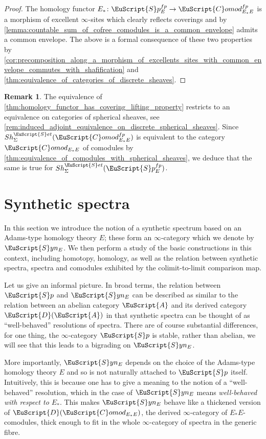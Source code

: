 \documentclass[oneside,a4paper]{amsart}
\newcommand{\euscr}[1]{\EuScript{#1}} %
\newcommand{\acat}{\euscr{A}} %
\newcommand{\dcat}{\euscr{D}} %
\newcommand{\spectra}{\euscr{S}p} %
\newcommand{\sets}{\euscr{S}et} %
\newcommand{\synspectra}{\euscr{S}yn} %
\newcommand{\spectrafp}{\spectra_{E}^{fp}} %
\newcommand{\Comod}{\euscr{C}omod} %
\newcommand{\ComodE}{\Comod_{E_{*}E}} %
\theoremstyle{plain}
\theoremstyle{definition}
\newtheorem{rem}[thm]{Remark}
\theoremstyle{remark}
\begin{document}
\begin{proof}
The homology functor $E_{*} \colon \spectrafp \rightarrow \ComodE^{fp}$ is a morphism of excellent $\infty$-sites which clearly reflects coverings and by \cref{lemma:countable_sum_of_cofree_comodules_is_a_common_envelope} admits a common envelope. The above is a formal consequence of these two properties by \cref{cor:precomposition_along_a_morphism_of_excellents_sites_with_common_envelope_commutes_with_shafification} and 
\cref{thm:equivalence_of_categories_of_discrete_sheaves}. 
\end{proof}

\begin{rem}
\label{rem:discrete_spherical_sheaves_on_fpspectra_are_comodules}
The equivalence of \cref{thm:homology_functor_has_covering_lifting_property} restricts to an equivalence on categories of spherical sheaves, see \cref{rem:induced_adjoint_equivalence_on_discrete_spherical_sheaves}. Since $Sh^{\sets}_{\Sigma}(\ComodE^{fp})$ is equivalent to the category $\ComodE$ of comodules by \cref{thm:equivalence_of_comodules_with_spherical_sheaves}, we deduce that the same is true for $Sh^{\sets}_{\Sigma}(\spectrafp)$. 
\end{rem}

\section{Synthetic spectra}
\label{section:synthetic_spectra}

In this section we introduce the notion of a synthetic spectrum based on an Adams-type homology theory $E$; these form an $\infty$-category which we denote by $\synspectra_{E}$. We then perform a study of the basic constructions in this context, including homotopy, homology, as well as the relation between synthetic spectra, spectra and comodules exhibited by the colimit-to-limit comparison map.

Let us give an informal picture. In broad terms, the relation between $\spectra$ and $\synspectra_{E}$ can be described as similar to the relation between an abelian category $\acat$ and its derived category $\dcat(\acat)$ in that synthetic spectra can be thought of as ``well-behaved'' resolutions of spectra. There are of course substantial differences, for one thing, the $\infty$-category $\spectra$ is stable, rather than abelian, we will see that this leads to a bigrading on $\synspectra_{E}$. 

More importantly, $\synspectra_{E}$ depends on the choice of the Adams-type homology theory $E$ and so is not naturally attached to $\spectra$ itself. Intuitively, this is because one has to give a meaning to the notion of a ``well-behaved'' resolution, which in the case of $\synspectra_{E}$ means \emph{well-behaved with respect to $E_{*}$}. This makes $\synspectra_{E}$ behave like a thickened version of $\dcat(\ComodE)$, the derived $\infty$-category of $E_{*}E$-comodules, thick enough to fit in the whole $\infty$-category of spectra in the generic fibre. 
\end{document}
